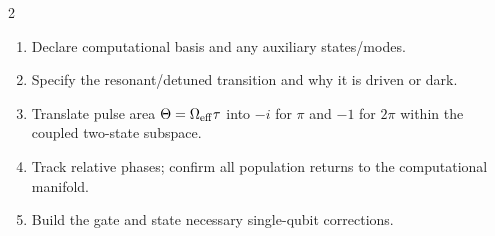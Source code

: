 \begin{multicols}{2}
\begin{enumerate}
\item Declare computational basis and any auxiliary states/modes.
\item Specify the resonant/detuned transition and why it is driven or dark.
\item Translate pulse area $\Theta=\Omega_{\rm eff}\tau$ into $-i$ for $\pi$ and $-1$ for $2\pi$ within the coupled two-state subspace.
\item Track relative phases; confirm all population returns to the computational manifold.
\item Build the gate and state necessary single-qubit corrections.
\end{enumerate}
\end{multicols}